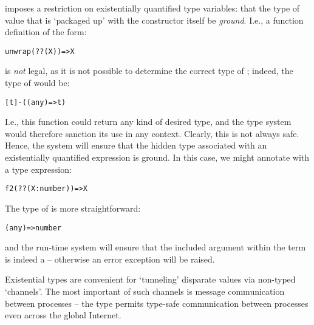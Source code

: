 \go imposes a restriction on existentially quantified type variables: that the type of value that is `packaged up' with the constructor itself be \emph{ground}. I.e., a function definition of the form:
\begin{alltt}
unwrap(??(X))=>X
\end{alltt}
is \emph{not} legal, as it is not possible to determine the correct type of ; indeed, the type of  would be:
\begin{alltt}
[t]-((any)=>t)
\end{alltt}
I.e., this function could return any kind of desired type, and the type system would therefore sanction its use in any context. Clearly, this is not always safe. Hence, the \go system will ensure that the hidden type associated with an existentially quantified expression is ground. In this case, we might annotate  with a type expression:
\begin{alltt}
f2(??(X:number))=>X
\end{alltt}
The type of  is more straightforward:
\begin{alltt}
(any)=>number
\end{alltt}
and the run-time system will ensure that the included argument within the  term is indeed a  -- otherwise an error exception will be raised.

Existential types are convenient for `tunneling' disparate values via non-typed `channels'. The most important of such channels is message communication between processes -- the  type permits type-safe communication between \go processes even across the global Internet.

 